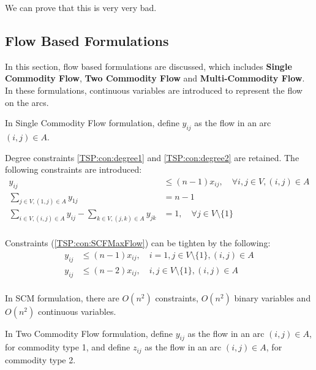 					We can prove that this is very very bad.


				\subsection{Flow Based Formulations}
					In this section, flow based formulations are discussed, which includes \textbf{Single Commodity Flow}, \textbf{Two Commodity Flow} and \textbf{Multi-Commodity Flow}. In these formulations, continuous variables are introduced to represent the flow on the arcs.

					In Single Commodity Flow formulation, define $y_{ij}$ as the flow in an arc $(i, j) \in A$.

					Degree constraints \ref{TSP:con:degree1} and \ref{TSP:con:degree2} are retained. The following constraints are introduced:
					\begin{align}
						y_{ij} & \le (n - 1) x_{ij}, \quad \forall i, j \in V, (i, j) \in A \label{TSP:con:SCFMaxFlow}\\
						\sum_{j \in V, (1, j) \in A} y_{1j} & = n - 1 \label{TSP:con:SCFInitFlow} \\
						\sum_{i \in V, (i, j) \in A} y_{ij} - \sum_{k \in V, (j, k) \in A} y_{jk} &= 1, \quad \forall j \in V \setminus \{1\} \label{TSP:con:SCFFlowBalance}\\
					\end{align}

					Constraints (\ref{TSP:con:SCFMaxFlow}) can be tighten by the following:
					\begin{align}
						y_{ij} &\le (n - 1) x_{ij}, \quad i = 1, j \in V \setminus \{1\}, (i, j) \in A \label{TSP:con:SCMMaxFlow1} \\
						y_{ij} &\le (n - 2) x_{ij}, \quad i, j \in V \setminus \{1\}, (i, j) \in A \label{TSP:con:SCMMaxFlow2} \\
					\end{align}

					In SCM formulation, there are $O(n^2)$ constraints, $O(n^2)$ binary variables and $O(n^2)$ continuous variables.

					In Two Commodity Flow formulation, define $y_{ij}$ as the flow in an arc $(i, j) \in A$, for commodity type 1, and define $z_{ij}$ as the flow in an arc $(i, j) \in A$, for commodity type 2.

